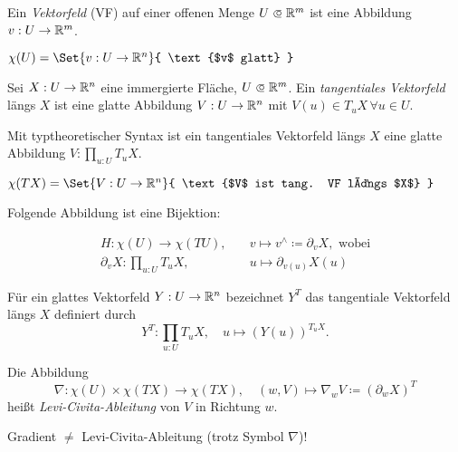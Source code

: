 \documentclass{cheat-sheet}
\begin{document}
\begin{definition}
  Ein \emph{Vektorfeld} (VF) auf einer offenen Menge $U \opn \R^m$ ist eine Abbildung $v : U \to \mathbb{R}^m$.
\end{definition}

\begin{nota}
  $\chi(U) = \Set{ v : U \to \R^n }{ \text{$v$ glatt} }$
\end{nota}

\begin{definition}
  Sei $X : U \to \mathbb{R}^n$ eine immergierte Fläche, $U \opn \R^m$. Ein \emph{tangentiales Vektorfeld} längs $X$ ist eine glatte Abbildung $V : U \to \mathbb{R}^n$ mit $V(u) \in T_u X \, \forall u \in U$.
\end{definition}

\begin{bem}
  Mit typtheoretischer Syntax ist ein tangentiales Vektorfeld längs $X$ eine glatte Abbildung $V : \prod_{u : U} T_u X$.
\end{bem}

\begin{nota}
  $\chi(TX) = \Set{ V : U \to \R^n }{ \text{$V$ ist tang. VF längs $X$} }$
\end{nota}

\begin{bem}
  Folgende Abbildung ist eine Bijektion:

  \begin{align*}
     H : \chi(U) \to \chi(TU), \quad &v \mapsto v^{\wedge} \coloneqq \partial_v X, \text{ wobei}\\
     \partial_v X : \prod_{u : U} T_u X, \quad &u \mapsto \partial_{v(u)} X(u)
   \end{align*} 
\end{bem}

\begin{nota}
  Für ein glattes Vektorfeld $Y : U \to \mathbb{R}^n$ bezeichnet $Y^T$ das tangentiale Vektorfeld längs $X$ definiert durch
  \[ Y^T : \prod_{u : U} T_u X, \quad u \mapsto (Y(u))^{T_u X}. \]
\end{nota}

\begin{definition}
  Die Abbildung
  \[
    \nabla : \chi(U) \times \chi(TX) \to \chi(TX), \quad
    (w, V) \mapsto \nabla_w V \coloneqq (\partial_w X)^T
  \]
  heißt \emph{Levi-Civita-Ableitung} von $V$ in Richtung $w$.
\end{definition}

\begin{acht}
  Gradient $\not=$ Levi-Civita-Ableitung (trotz Symbol $\nabla$)!
\end{acht}
\end{document}
